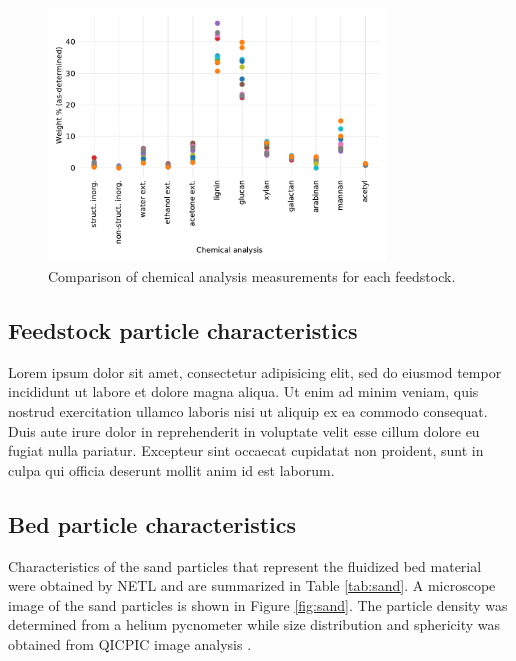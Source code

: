 \documentclass[12pt,titlepage]{article}
\begin{document}
\begin{figure}[H]
    \centering
    \includegraphics[width=0.8\textwidth]{figures/chem-analysis.pdf}
    \caption{Comparison of chemical analysis measurements for each feedstock.}
    \label{fig:chem-analysis}
\end{figure}

\subsection{Feedstock particle characteristics}

Lorem ipsum dolor sit amet, consectetur adipisicing elit, sed do eiusmod
tempor incididunt ut labore et dolore magna aliqua. Ut enim ad minim veniam,
quis nostrud exercitation ullamco laboris nisi ut aliquip ex ea commodo
consequat. Duis aute irure dolor in reprehenderit in voluptate velit esse
cillum dolore eu fugiat nulla pariatur. Excepteur sint occaecat cupidatat non
proident, sunt in culpa qui officia deserunt mollit anim id est laborum.

\subsection{Bed particle characteristics}

Characteristics of the sand particles that represent the fluidized bed material were obtained by NETL and are summarized in Table \ref{tab:sand}. A microscope image of the sand particles is shown in Figure \ref{fig:sand}. The particle density was determined from a helium pycnometer while size distribution and sphericity was obtained from QICPIC image analysis \cite{Netl-2021}.
\end{document}
